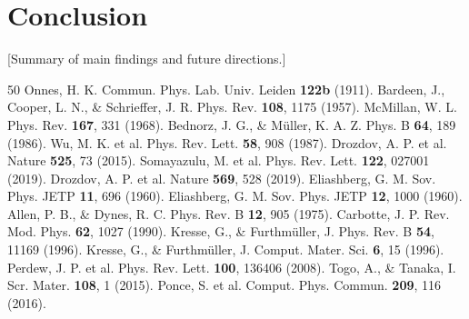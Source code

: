 \documentclass[11pt,a4paper]{article}
\theoremstyle{definition}
\begin{document}
\section{Conclusion}\label{sec:conclusion}

[Summary of main findings and future directions.]

\begin{thebibliography}{50}
 Onnes, H. K. Commun. Phys. Lab. Univ. Leiden \textbf{122b} (1911).
 Bardeen, J., Cooper, L. N., \& Schrieffer, J. R. Phys. Rev. \textbf{108}, 1175 (1957).
 McMillan, W. L. Phys. Rev. \textbf{167}, 331 (1968).
 Bednorz, J. G., \& M\"uller, K. A. Z. Phys. B \textbf{64}, 189 (1986).
 Wu, M. K. et al. Phys. Rev. Lett. \textbf{58}, 908 (1987).
 Drozdov, A. P. et al. Nature \textbf{525}, 73 (2015).
 Somayazulu, M. et al. Phys. Rev. Lett. \textbf{122}, 027001 (2019).
 Drozdov, A. P. et al. Nature \textbf{569}, 528 (2019).
 Eliashberg, G. M. Sov. Phys. JETP \textbf{11}, 696 (1960).
 Eliashberg, G. M. Sov. Phys. JETP \textbf{12}, 1000 (1960).
 Allen, P. B., \& Dynes, R. C. Phys. Rev. B \textbf{12}, 905 (1975).
 Carbotte, J. P. Rev. Mod. Phys. \textbf{62}, 1027 (1990).
 Kresse, G., \& Furthm\"uller, J. Phys. Rev. B \textbf{54}, 11169 (1996).
 Kresse, G., \& Furthm\"uller, J. Comput. Mater. Sci. \textbf{6}, 15 (1996).
 Perdew, J. P. et al. Phys. Rev. Lett. \textbf{100}, 136406 (2008).
 Togo, A., \& Tanaka, I. Scr. Mater. \textbf{108}, 1 (2015).
 Ponce, S. et al. Comput. Phys. Commun. \textbf{209}, 116 (2016).
\end{thebibliography}
\end{document}
